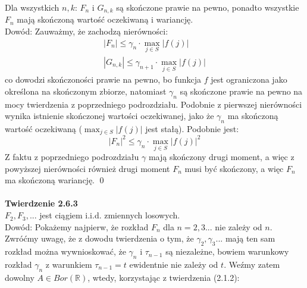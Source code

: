 \documentclass[a4paper]{article}
\begin{document}
Dla wszystkich $n,k$: $F_n$ i $G_{n,k}$ są skończone prawie na pewno, ponadto wszystkie $F_n$ mają skończoną wartość oczekiwaną i wariancję.\\
Dowód: Zauważmy, że zachodzą nierówności:
\begin{align*}
    |F_n| \leq \gamma_n \cdot \max_{j \in S} |f(j)|\\
    |G_{n,k}| \leq \gamma_{n+1} \cdot \max_{j \in S} |f(j)|
\end{align*}
co dowodzi skończoności prawie na pewno, bo funkcja $f$ jest ograniczona jako określona na skończonym zbiorze, natomiast $\gamma_n$ są skończone prawie na pewno na mocy twierdzenia z poprzedniego podrozdziału. Podobnie z pierwszej nierówności wynika istnienie skończonej wartości oczekiwanej, jako że $\gamma_n$ ma skończoną wartość oczekiwaną ($\max_{j \in S} |f(j)|$ jest stałą). Podobnie jest:
$$|F_n|^2 \leq \gamma_n \cdot \max_{j \in S} |f(j)|^2$$
Z faktu z poprzedniego podrozdziału $\gamma$ mają skończony drugi moment, a więc z powyższej nierówności również drugi moment $F_n$ musi być skończony, a więc $F_n$ ma skończoną wariancję. \qed
\\\\
\textbf{Twierdzenie 2.6.3}\\
$F_2, F_3,...$ jest ciągiem i.i.d. zmiennych losowych.\\
Dowód: Pokażemy najpierw, że rozkład $F_n$ dla $n=2,3...$ nie zależy od $n$. Zwróćmy uwagę, że z dowodu twierdzenia o tym, że $\gamma_2, \gamma_3...$ mają ten sam rozkład można wywnioskować, że $\gamma_n$ i $\tau_{n-1}$ są niezależne, bowiem warunkowy rozkład $\gamma_n$ z warunkiem $\tau_{n-1} = t$ ewidentnie nie zależy od $t$. Weźmy zatem dowolny $A \in Bor(\mathbb{R})$, wtedy, korzystając z twierdzenia (2.1.2):
\end{document}

